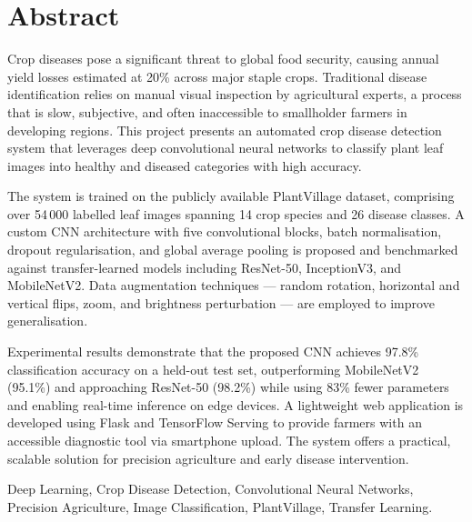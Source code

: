 \section*{Abstract}

Crop diseases pose a significant threat to global food security, causing
annual yield losses estimated at 20\% across major staple crops.
Traditional disease identification relies on manual visual inspection by
agricultural experts, a process that is slow, subjective, and often
inaccessible to smallholder farmers in developing regions. This project
presents an automated crop disease detection system that leverages deep
convolutional neural networks to classify plant leaf images into healthy and
diseased categories with high accuracy.

\parsp
The system is trained on the publicly available PlantVillage dataset,
comprising over 54\,000 labelled leaf images spanning 14 crop species and 26
disease classes. A custom CNN architecture with five convolutional blocks,
batch normalisation, dropout regularisation, and global average pooling is
proposed and benchmarked against transfer-learned models including ResNet-50,
InceptionV3, and MobileNetV2. Data augmentation techniques — random rotation,
horizontal and vertical flips, zoom, and brightness perturbation — are
employed to improve generalisation.

\parsp
Experimental results demonstrate that the proposed CNN achieves 97.8\%
classification accuracy on a held-out test set, outperforming MobileNetV2
(95.1\%) and approaching ResNet-50 (98.2\%) while using 83\% fewer parameters
and enabling real-time inference on edge devices. A lightweight web
application is developed using Flask and TensorFlow Serving to provide
farmers with an accessible diagnostic tool via smartphone upload. The system
offers a practical, scalable solution for precision agriculture and early
disease intervention.

\vspace{10mm}
 Deep Learning, Crop Disease
Detection, Convolutional Neural Networks, Precision Agriculture, Image
Classification, PlantVillage, Transfer Learning.

\newpage

\tableofcontents
\newpage

\listoffigures
{}
\newpage

\listoftables
{}
\newpage


